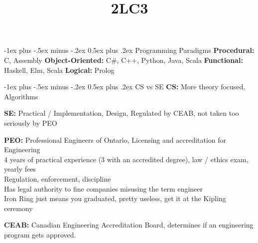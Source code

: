 \documentclass[letterpaper, 8pt]{extarticle}
\title{2LC3}
\makeatletter
\renewcommand{\section}{\@startsection{section}{1}{0mm}%
                                {-1ex plus -.5ex minus -.2ex}%
                                {0.5ex plus .2ex}%
                                {\normalfont\normalsize\bfseries}}
\makeatother
\begin{document}
\raggedright
\tiny


\setlength{\premulticols}{1pt}
\setlength{\postmulticols}{1pt}
\setlength{\multicolsep}{1pt}
\setlength{\columnsep}{2pt}
\begin{multicols*}{5}


  \section{Programming Paradigms}
  \textbf{Procedural:} C, Assembly
  \textbf{Object-Oriented:} C\#, C++, Python, Java, Scala
  \textbf{Functional:} Haskell, Elm, Scala
  \textbf{Logical:} Prolog

  \section{CS vs SE}
  \textbf{CS:} More theory focused, Algorithms

  \textbf{SE:} Practical / Implementation, Design,
  Regulated by CEAB, not taken too seriously by PEO

  \textbf{PEO:} Professional Engineers of Ontario, Licensing and accreditation for Engineering \\
  4 years of practical experience (3 with an accredited degree), law / ethics exam, yearly fees \\
  Regulation, enforcement, discipline \\
  Has legal authority to fine companies misusing the term engineer \\
  Iron Ring just means you graduated, pretty useless, get it at the Kipling ceremony

  \textbf{CEAB:} Canadian Engineering Accreditation Board,
  determines if an engineering program gets approved.


\end{multicols*}
\end{document}

